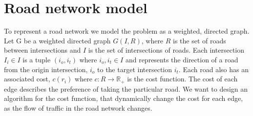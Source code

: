 \section{Road network model}
To represent a road network we model the problem as a weighted, directed graph. \\
Let G be a weighted directed graph $G(I,R)$, where $R$ is the set of roads between intersections and $I$ is the set of intersections of roads. Each intersection $I_i \in I$ is a tuple $(i_o, i_t)$ where $i_o, i_t \in I$ and represents the direction of a road from the origin intersection, $i_o$ to the target intersection $i_t$. Each road also has an associated cost, $c(r_i)$ where  $c: R \rightarrow \mathbb R_+$ is the cost function. The cost of each edge describes the preference of taking the particular road. 
We want to design an algorithm for the cost function, that dynamically change the cost for each edge, as the flow of traffic in the road network changes.